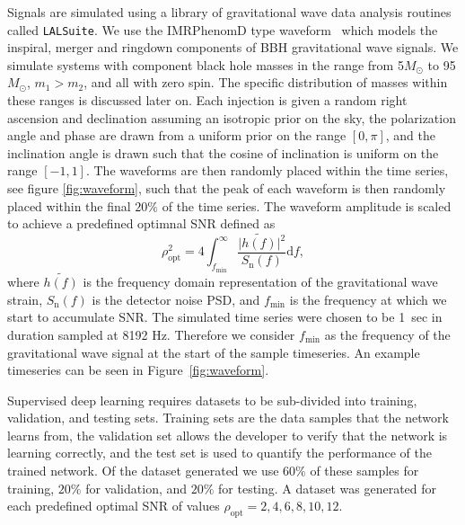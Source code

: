 \documentclass[%
showpacs,
 amsmath,amssymb,
 aps,
 twocolumn,
 prl,
 reprint,
floatfix,
]{revtex4-1}
\begin{document}
%
%
Signals are simulated using a library of gravitational wave data analysis
routines called \texttt{LALSuite}. We use the IMRPhenomD type
waveform~\cite{PhysRevD.93.044006, PhysRevD.93.044007} which models the
inspiral, merger and ringdown components of \ac{BBH} gravitational wave
signals. We simulate systems with component black hole masses in the range from
5\(M_\odot\) to 95\(M_\odot\), $m_{1} > m_{2}$, and all with zero spin. The
specific distribution of masses within these ranges is discussed later on. Each
injection is given a random right ascension and declination assuming an
isotropic prior on the sky, the polarization angle and phase are drawn from a
uniform prior on the range $[0,\pi]$, and the inclination angle is drawn such
that the cosine of inclination is uniform on the range $[-1,1]$. The waveforms
are then randomly placed within the time series, see figure \ref{fig:waveform},
such that the peak of each waveform is then randomly placed within the final $ 20\% $ of the time series. 
The waveform amplitude is scaled to achieve a predefined optimnal
\ac{SNR} defined as
%
%
\begin{equation} \label{eq:snr} \rho_{\mathrm{opt}}^{2} = 4
\int_{f_{\mathrm{min}}}^{\infty} \frac{\lvert
\tilde{h(f)}\rvert^{2}}{S_{\mathrm{n}}(f)} \mathrm{d}f, \end{equation}
%
where $\tilde{h(f)}$ is the frequency domain representation of the
gravitational wave strain, $S_{\mathrm{n}}(f)$ is the detector noise \ac{PSD},
and $f_{\mathrm{min}}$ is the frequency at which we start to accumulate
\ac{SNR}. The simulated time series were chosen to be 1~sec in duration sampled
at 8192 Hz. Therefore we consider $f_{\mathrm{min}}$ as the
frequency of the gravitational wave signal at the start of the sample
timeseries. An example timeseries can be seen in Figure~\ref{fig:waveform}. 

%
%
Supervised deep learning requires
datasets to be sub-divided into training, validation, and testing sets. Training sets are the data samples that the network learns from, the validation
set allows the developer to verify that the network is learning correctly, and
the test set is used to quantify the performance of the trained network.
Of the dataset generated we use $60\%$ of these samples for training,
$20\%$ for validation, and $20\%$ for testing. A dataset was generated for each 
predefined optimal SNR of values $ \rho_{\mathrm{opt}} = 2, 4, 6, 8, 10, 12 $.
\end{document}

